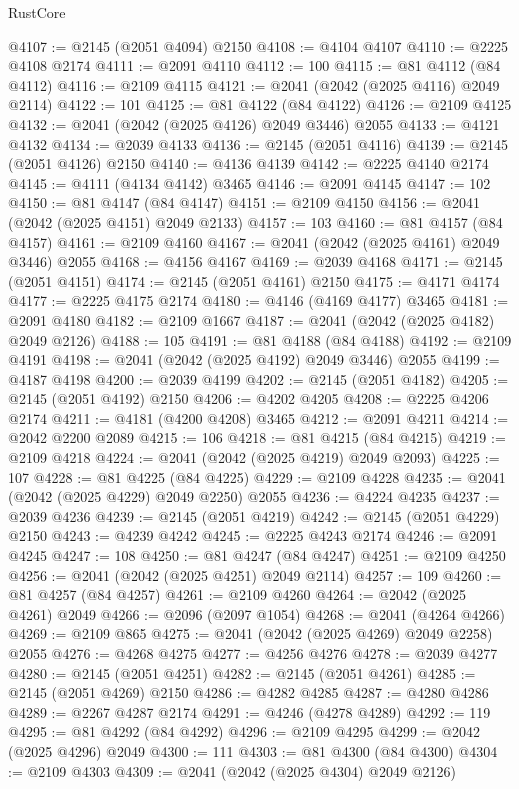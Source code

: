 \begin{lexlean}{RustCore}
\begin{coremodule}
@4107 := @2145 (@2051 @4094) @2150
@4108 := @4104 @4107
@4110 := @2225 @4108 @2174
@4111 := @2091 @4110
@4112 := 100
@4115 := @81 @4112 (@84 @4112)
@4116 := @2109 @4115
@4121 := @2041 (@2042 (@2025 @4116) @2049 @2114)
@4122 := 101
@4125 := @81 @4122 (@84 @4122)
@4126 := @2109 @4125
@4132 := @2041 (@2042 (@2025 @4126) @2049 @3446) @2055
@4133 := @4121 @4132
@4134 := @2039 @4133
@4136 := @2145 (@2051 @4116)
@4139 := @2145 (@2051 @4126) @2150
@4140 := @4136 @4139
@4142 := @2225 @4140 @2174
@4145 := @4111 (@4134 @4142) @3465
@4146 := @2091 @4145
@4147 := 102
@4150 := @81 @4147 (@84 @4147)
@4151 := @2109 @4150
@4156 := @2041 (@2042 (@2025 @4151) @2049 @2133)
@4157 := 103
@4160 := @81 @4157 (@84 @4157)
@4161 := @2109 @4160
@4167 := @2041 (@2042 (@2025 @4161) @2049 @3446) @2055
@4168 := @4156 @4167
@4169 := @2039 @4168
@4171 := @2145 (@2051 @4151)
@4174 := @2145 (@2051 @4161) @2150
@4175 := @4171 @4174
@4177 := @2225 @4175 @2174
@4180 := @4146 (@4169 @4177) @3465
@4181 := @2091 @4180
@4182 := @2109 @1667
@4187 := @2041 (@2042 (@2025 @4182) @2049 @2126)
@4188 := 105
@4191 := @81 @4188 (@84 @4188)
@4192 := @2109 @4191
@4198 := @2041 (@2042 (@2025 @4192) @2049 @3446) @2055
@4199 := @4187 @4198
@4200 := @2039 @4199
@4202 := @2145 (@2051 @4182)
@4205 := @2145 (@2051 @4192) @2150
@4206 := @4202 @4205
@4208 := @2225 @4206 @2174
@4211 := @4181 (@4200 @4208) @3465
@4212 := @2091 @4211
@4214 := @2042 @2200 @2089
@4215 := 106
@4218 := @81 @4215 (@84 @4215)
@4219 := @2109 @4218
@4224 := @2041 (@2042 (@2025 @4219) @2049 @2093)
@4225 := 107
@4228 := @81 @4225 (@84 @4225)
@4229 := @2109 @4228
@4235 := @2041 (@2042 (@2025 @4229) @2049 @2250) @2055
@4236 := @4224 @4235
@4237 := @2039 @4236
@4239 := @2145 (@2051 @4219)
@4242 := @2145 (@2051 @4229) @2150
@4243 := @4239 @4242
@4245 := @2225 @4243 @2174
@4246 := @2091 @4245
@4247 := 108
@4250 := @81 @4247 (@84 @4247)
@4251 := @2109 @4250
@4256 := @2041 (@2042 (@2025 @4251) @2049 @2114)
@4257 := 109
@4260 := @81 @4257 (@84 @4257)
@4261 := @2109 @4260
@4264 := @2042 (@2025 @4261) @2049
@4266 := @2096 (@2097 @1054)
@4268 := @2041 (@4264 @4266)
@4269 := @2109 @865
@4275 := @2041 (@2042 (@2025 @4269) @2049 @2258) @2055
@4276 := @4268 @4275
@4277 := @4256 @4276
@4278 := @2039 @4277
@4280 := @2145 (@2051 @4251)
@4282 := @2145 (@2051 @4261)
@4285 := @2145 (@2051 @4269) @2150
@4286 := @4282 @4285
@4287 := @4280 @4286
@4289 := @2267 @4287 @2174
@4291 := @4246 (@4278 @4289)
@4292 := 119
@4295 := @81 @4292 (@84 @4292)
@4296 := @2109 @4295
@4299 := @2042 (@2025 @4296) @2049
@4300 := 111
@4303 := @81 @4300 (@84 @4300)
@4304 := @2109 @4303
@4309 := @2041 (@2042 (@2025 @4304) @2049 @2126)

\end{coremodule}
\end{lexlean}
